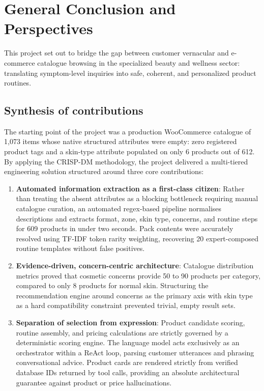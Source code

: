 ﻿%
\clearpage
{}
{}
\chapter*{General Conclusion and Perspectives}

This project set out to bridge the gap between customer vernacular and e-commerce catalogue browsing in the specialized beauty and wellness sector: translating symptom-level inquiries into safe, coherent, and personalized product routines.

\section*{Synthesis of contributions}

The starting point of the project was a production WooCommerce catalogue of 1{,}073 items whose native structured attributes were empty: zero registered product tags and a skin-type attribute populated on only 6 products out of 612. By applying the CRISP-DM methodology, the project delivered a multi-tiered engineering solution structured around three core contributions:

\begin{enumerate}
  \item \textbf{Automated information extraction as a first-class citizen}: Rather than treating the absent attributes as a blocking bottleneck requiring manual catalogue curation, an automated regex-based pipeline normalises descriptions and extracts format, zone, skin type, concerns, and routine steps for 609 products in under two seconds. Pack contents were accurately resolved using TF-IDF token rarity weighting, recovering 20 expert-composed routine templates without false positives.
  \item \textbf{Evidence-driven, concern-centric architecture}: Catalogue distribution metrics proved that cosmetic concerns provide 50 to 90 products per category, compared to only 8 products for normal skin. Structuring the recommendation engine around concerns as the primary axis with skin type as a hard compatibility constraint prevented trivial, empty result sets.
  \item \textbf{Separation of selection from expression}: Product candidate scoring, routine assembly, and pricing calculations are strictly governed by a deterministic scoring engine. The language model acts exclusively as an orchestrator within a ReAct loop, parsing customer utterances and phrasing conversational advice. Product cards are rendered strictly from verified database IDs returned by tool calls, providing an absolute architectural guarantee against product or price hallucinations.
\end{enumerate}

